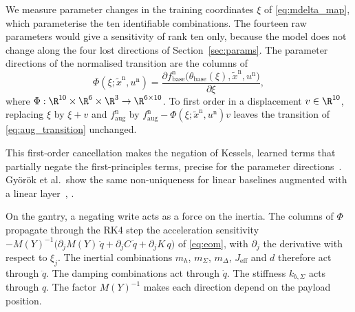 We measure parameter changes in the training coordinates $\xi$ of
\eqref{eq:mdelta_map}, which parameterise the ten identifiable combinations.
The fourteen raw parameters would give a sensitivity of rank ten only, because
the model does not change along the four lost directions of
Section~\ref{sec:params}.
The parameter directions of the normalised transition are the columns of
\begin{equation}
 \Phi(\xi;\tilde x^{\mathrm n},u^{\mathrm n})
 =\frac{\partial f^{\mathrm n}_{\mathrm{base}}
   \bigl(\theta_{\mathrm{base}}(\xi),\tilde x^{\mathrm n},u^{\mathrm n}\bigr)}
   {\partial\xi},
 \label{eq:obc_sens}
\end{equation}
where $\Phi:\R^{10}\times\R^6\times\R^3\to\R^{6\times10}$.
To first order in a displacement $v\in\R^{10}$, replacing $\xi$ by $\xi+v$
and $f^{\mathrm n}_{\mathrm{aug}}$ by
$f^{\mathrm n}_{\mathrm{aug}}-\Phi(\xi;\tilde x^{\mathrm n},u^{\mathrm n})v$
leaves the transition of \eqref{eq:aug_transition} unchanged.

This first-order cancellation makes the negation of Kessels, learned terms
that partially negate the first-principles terms, precise for the parameter
directions~\cite[Sec.~5.3.1.3]{kessels2025ai}.
Gy\"or\"ok et al.\ show the same non-uniqueness for linear baselines
augmented with a linear layer~\cite[Ex.~2]{gyorok2026obc},
\cite[Ex.~1]{gyorok2025l4dc}.

On the gantry, a negating write acts as a force on the inertia.
The columns of $\Phi$ propagate through the RK4 step the acceleration
sensitivity $-M(Y)^{-1}\bigl(\partial_jM(Y)\,\ddot q+\partial_jC\,\dot q
+\partial_jK\,q\bigr)$ of \eqref{eq:eom}, with $\partial_j$ the derivative
with respect to $\xi_j$.
The inertial combinations $m_h$, $m_\Sigma$, $m_\Delta$, $J_{\mathrm{eff}}$
and $d$ therefore act through $\ddot q$.
The damping combinations act through $\dot q$.
The stiffness $k_{b,\Sigma}$ acts through $q$.
The factor $M(Y)^{-1}$ makes each direction depend on the payload position.

